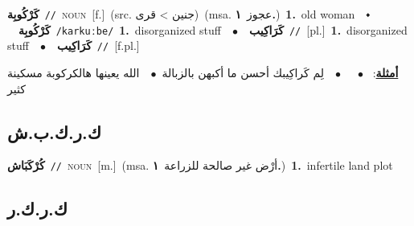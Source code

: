 \documentclass[10pt,a4paper,twoside]{article} %
\begin{document}
\begin{multicols}{2}
{\setlength\topsep{0pt}\textbf{\foreignlanguage{arabic}{كَرْكُوبِة}}\ {\color{gray}\texttt{//}\color{black}}\ \textsc{noun}\ [f.]\ (src. \color{gray}\foreignlanguage{arabic}{جنين > قرى}\color{black})\ \color{gray}(msa. \foreignlanguage{arabic}{عجوز}~\foreignlanguage{arabic}{\textbf{١.}})\color{black}\ \textbf{1.}~old woman\ \ $\smblkdiamond$\ \ \setlength\topsep{0pt}\textbf{\foreignlanguage{arabic}{كَرْكُوبِة}}\ {\color{gray}\texttt{/karkuːbe/}\color{black}}\ \textbf{1.}~disorganized stuff\ \ $\bullet$\ \ \setlength\topsep{0pt}\textbf{\foreignlanguage{arabic}{كَرَاكِيب}}\ {\color{gray}\texttt{//}\color{black}}\ [pl.]\ \textbf{1.}~disorganized stuff\ \ $\bullet$\ \ \setlength\topsep{0pt}\textbf{\foreignlanguage{arabic}{كَرَاكِيب}}\ {\color{gray}\texttt{//}\color{black}}\ [f.pl.]\  \begin{flushright}\color{gray}\foreignlanguage{arabic}{\textbf{\underline{\foreignlanguage{arabic}{أمثلة}}}: \ $\bullet$\ \  \ $\bullet$\ \  لِم كَراكِيبك أحسن ما أكبهن بالزبالة\ $\bullet$\ \  الله يعينها هالكركوبة مسكينة كثير}\end{flushright}\color{black}} \vspace{2mm}

\vspace{-3mm}
\subsection*{\color{blue}\foreignlanguage{arabic}{ك.ر.ك.ب.ش}\color{blue}{ (ntws)}} 

{\setlength\topsep{0pt}\textbf{\foreignlanguage{arabic}{كُرْكَبَاش}}\ {\color{gray}\texttt{//}\color{black}}\ \textsc{noun}\ [m.]\ \color{gray}(msa. \foreignlanguage{arabic}{أرْض غير صالحة للزراعة}~\foreignlanguage{arabic}{\textbf{١.}})\color{black}\ \textbf{1.}~infertile land plot\ } \vspace{2mm}

\vspace{-3mm}
\subsection*{\color{blue}\foreignlanguage{arabic}{ك.ر.ك.ر}\color{blue}{}} 


\end{multicols}
\end{document}
